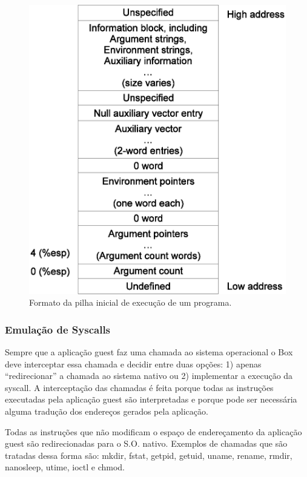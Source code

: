 \documentclass[11pt,twoside]{article}
\begin{document}
\begin{figure}[!h]
  	\begin{center}
    	\includegraphics[scale=0.5]{figures/stack_ini.eps}
	\end{center}
	\caption{Formato da pilha inicial de execução de um programa.}
	\label{fig:stack_ini}
\end{figure}

\subsubsection{Emulação de Syscalls}

Sempre que a aplicação guest faz uma chamada ao sistema operacional o Box deve
interceptar essa chamada e decidir entre duas opções: 1) apenas ``redirecionar''
a chamada ao sistema nativo ou 2) implementar a execução da syscall. A
interceptação das chamadas é feita porque todas as instruções executadas pela
aplicação guest são interpretadas e porque pode ser necessária alguma tradução
dos endereços gerados pela aplicação.

Todas as instruções que não modificam o espaço de endereçamento da aplicação
guest são redirecionadas para o S.O. nativo. Exemplos de chamadas que são
tratadas dessa forma são: mkdir, fstat, getpid, getuid, uname, rename, rmdir,
nanosleep, utime, ioctl e chmod.
\end{document}
